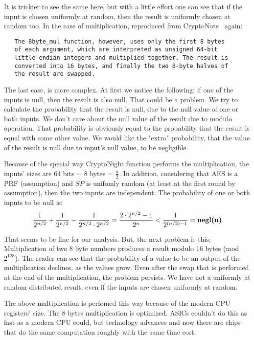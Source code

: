It is trickier to see the same here, but with a little effort one can see that if the input is chosen uniformly at random, then the result is uniformly chosen at random too. In the case of multiplication, reproduced from CryptoNote~\cite{cryptonight} again:
\begin{verbatim}
   The 8byte_mul function, however, uses only the first 8 bytes
   of each argument, which are interpreted as unsigned 64-bit
   little-endian integers and multiplied together. The result is
   converted into 16 bytes, and finally the two 8-byte halves of
   the result are swapped.
\end{verbatim}

The last case, is more complex. At first we notice the following: if one of the inputs is null, then the result is also null. That could be a problem. We try to calculate the probability that the result is null, due to the null value of one or both inputs. We don't care about the null value of the result due to modulo operation. That probability is obviously equal to the probability that the result is equal with some other value. We would like the "extra" probability, that the value of the result is null due to input's null value, to be negligible.

Because of the special way CryptoNight function performs the multiplication, the inputs' sizes are 64 bits = 8 bytes = $\frac{n}{2}$. In addition, considering that AES is a PRF (assumption) and $SP$ is unifomly random (at least at the first round by assumption), then the two inputs are independent. The probability of one or both inputs to be null is:
\begin{equation} \label{prob_zero}
  \frac{1}{2^{n/2}} + \frac{1}{2^{n/2}} - \frac{1}{2^{n/2} \cdot 2^{n/2}} = \frac{2\cdot2^{n/2}-1}{2^n} < \frac{1}{2^{(n/2)-1}} = \mbox{\textbf{negl(n)}}
\end{equation}
\vspace{0.3cm}

That seems to be fine for our analysis. But, the next problem is this: Multiplication of two 8 byte numbers produces a result modulo 16 bytes (mod $2^{128}$). The reader can see that the probability of a value to be an output of the multiplication declines, as the values grow. Even after the swap that is performed at the end of the multiplication, the problem persists. We have not a uniformly at random distributed result, even if the inputs are chosen uniformly at random.

The above multiplication is perfomed this way because of the modern CPU registers' size. The 8 bytes multiplication is optimized. ASICs couldn't do this as fast as a modern CPU could, but technology advances and now there are chips that do the same computation roughly with the same time cost.

